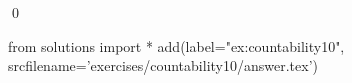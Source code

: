 
\begin{ex} 
  \label{ex:countability10}
  
  \qed
\end{ex} 
\begin{python0}
from solutions import *
add(label="ex:countability10",
    srcfilename='exercises/countability10/answer.tex') 
\end{python0}
